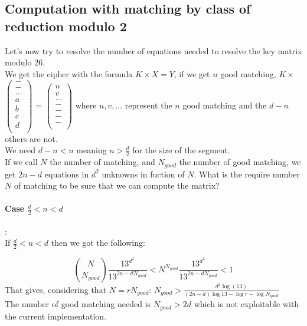 \documentclass{article}
\begin{document}
\subsection{Computation with matching by class of reduction modulo 2}
Let's now try to resolve the number of equations needed to resolve the key matrix modulo 26.\\
We get the cipher with the formula $ K \times X = Y$, if we get $n$ good matching, $ K \times $  $\begin{pmatrix}
  - \\
  - \\
... \\
  a \\
	b\\
	c\\
	d\\
 \end{pmatrix} $
 = $\begin{pmatrix}
  u \\
  v \\
... \\
  - \\
	-\\
	-\\
	-\\
 \end{pmatrix}$
where $ u, v,... $ represent the $n$ good matching and the $d-n $ others are not.\\
We need $d-n < n $ meaning $n > \frac{d}{2}$ for the size of the segment.\\
If we call $N$ the number of matching, and $N_{good}$ the number of good matching, we get $2n-d$ equations in $d^2$ unknowns in fuction of $N$.
What is the require number $N$ of matching to be sure that we can compute the matrix?\\
\paragraph{Case $\frac{d}{2} < n < d $}:\\

If $ \frac{d}{2} < n < d $ then we got the following:

$${N \choose N_{good}} \frac{13^{d^{2}}}{13^{2n-d N_{good}}} <  N^{N_{good}} \frac{13^{d^{2}}}{13^{2n-d N_{good}}} < 1$$
That gives, considering that $N = r N_{good}$: $N_{good} > \frac{d^{2} \log(13)}{(2n-d)\log 13 - \log r - \log N_{good}}$\\
The number of good matching needed is $N_{good} > 2d$ which is not exploitable with the current implementation.\\
\end{document}
